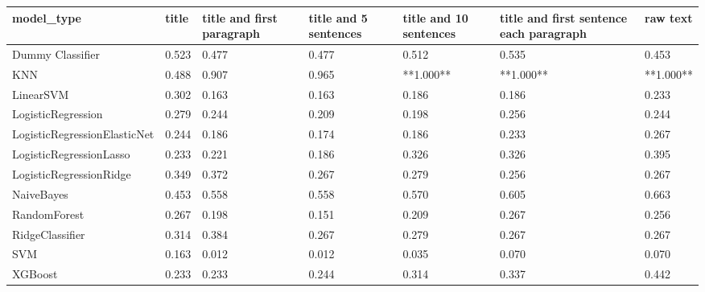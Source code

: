 \begin{tabular}{lllllll}
\toprule
                  model\_type & title & title and first paragraph & title and 5 sentences & title and 10 sentences & title and first sentence each paragraph &  raw text \\
\midrule
            Dummy Classifier & 0.523 &                     0.477 &                 0.477 &                  0.512 &                                   0.535 &     0.453 \\
                         KNN & 0.488 &                     0.907 &                 0.965 &              **1.000** &                               **1.000** & **1.000** \\
                   LinearSVM & 0.302 &                     0.163 &                 0.163 &                  0.186 &                                   0.186 &     0.233 \\
          LogisticRegression & 0.279 &                     0.244 &                 0.209 &                  0.198 &                                   0.256 &     0.244 \\
LogisticRegressionElasticNet & 0.244 &                     0.186 &                 0.174 &                  0.186 &                                   0.233 &     0.267 \\
     LogisticRegressionLasso & 0.233 &                     0.221 &                 0.186 &                  0.326 &                                   0.326 &     0.395 \\
     LogisticRegressionRidge & 0.349 &                     0.372 &                 0.267 &                  0.279 &                                   0.256 &     0.267 \\
                  NaiveBayes & 0.453 &                     0.558 &                 0.558 &                  0.570 &                                   0.605 &     0.663 \\
                RandomForest & 0.267 &                     0.198 &                 0.151 &                  0.209 &                                   0.267 &     0.256 \\
             RidgeClassifier & 0.314 &                     0.384 &                 0.267 &                  0.279 &                                   0.267 &     0.267 \\
                         SVM & 0.163 &                     0.012 &                 0.012 &                  0.035 &                                   0.070 &     0.070 \\
                     XGBoost & 0.233 &                     0.233 &                 0.244 &                  0.314 &                                   0.337 &     0.442 \\
\bottomrule
\end{tabular}
